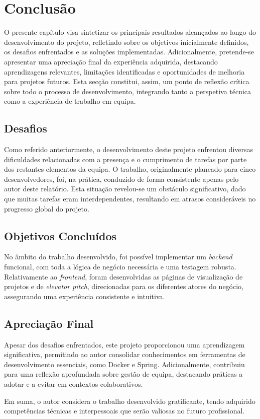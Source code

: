 \chapter{Conclusão}

O presente capítulo visa sintetizar os principais resultados alcançados ao longo do desenvolvimento do projeto, refletindo sobre os objetivos inicialmente definidos, os desafios enfrentados e as soluções implementadas. Adicionalmente, pretende-se apresentar uma apreciação final da experiência adquirida, destacando aprendizagens relevantes, limitações identificadas e oportunidades de melhoria para projetos futuros. Esta secção constitui, assim, um ponto de reflexão crítica sobre todo o processo de desenvolvimento, integrando tanto a perspetiva técnica como a experiência de trabalho em equipa.

\section{Desafios}

Como referido anteriormente, o desenvolvimento deste projeto enfrentou diversas dificuldades relacionadas com a presença e o cumprimento de tarefas por parte dos restantes elementos da equipa. O trabalho, originalmente planeado para cinco desenvolvedores, foi, na prática, conduzido de forma consistente apenas pelo autor deste relatório. Esta situação revelou-se um obstáculo significativo, dado que muitas tarefas eram interdependentes, resultando em atrasos consideráveis no progresso global do projeto.

\section{Objetivos Concluídos}

No âmbito do trabalho desenvolvido, foi possível implementar um \textit{backend} funcional, com toda a lógica de negócio necessária e uma testagem robusta. Relativamente ao \textit{frontend}, foram desenvolvidas as páginas de visualização de projetos e de \textit{elevator pitch}, direcionadas para os diferentes atores do negócio, assegurando uma experiência consistente e intuitiva.

\section{Apreciação Final}

Apesar dos desafios enfrentados, este projeto proporcionou uma aprendizagem significativa, permitindo ao autor consolidar conhecimentos em ferramentas de desenvolvimento essenciais, como \gls{Docker} e \gls{Spring}. Adicionalmente, contribuiu para uma reflexão aprofundada sobre gestão de equipa, destacando práticas a adotar e a evitar em contextos colaborativos.  

Em suma, o autor considera o trabalho desenvolvido gratificante, tendo adquirido competências técnicas e interpessoais que serão valiosas no futuro profissional.
